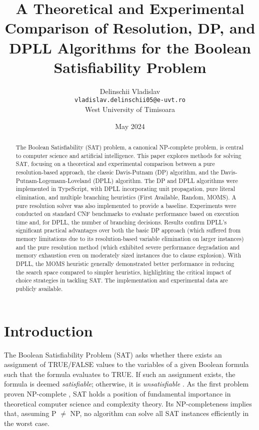 \documentclass[12pt, a4paper]{article}
\title{A Theoretical and Experimental Comparison of Resolution, DP, and DPLL Algorithms for the Boolean Satisfiability Problem}
\author{Delinschii Vladislav\\ \texttt{vladislav.delinschii05@e-uvt.ro} \\ West University of Timisoara}
\date{May 2024}
\begin{document}
\maketitle

\begin{abstract}
The Boolean Satisfiability (SAT) problem, a canonical NP-complete problem, is central to computer science and artificial intelligence. This paper explores methods for solving SAT, focusing on a theoretical and experimental comparison between a pure resolution-based approach, the classic Davis-Putnam (DP) algorithm, and the Davis-Putnam-Logemann-Loveland (DPLL) algorithm. The DP and DPLL algorithms were implemented in TypeScript, with DPLL incorporating unit propagation, pure literal elimination, and multiple branching heuristics (First Available, Random, MOMS). A pure resolution solver was also implemented to provide a baseline. Experiments were conducted on standard CNF benchmarks to evaluate performance based on execution time and, for DPLL, the number of branching decisions. Results confirm DPLL's significant practical advantages over both the basic DP approach (which suffered from memory limitations due to its resolution-based variable elimination on larger instances) and the pure resolution method (which exhibited severe performance degradation and memory exhaustion even on moderately sized instances due to clause explosion). With DPLL, the MOMS heuristic generally demonstrated better performance in reducing the search space compared to simpler heuristics, highlighting the critical impact of choice strategies in tackling SAT. The implementation and experimental data are publicly available.
\end{abstract}

\section{Introduction}
\label{sec:introduction} 
The Boolean Satisfiability Problem (SAT) asks whether there exists an assignment of TRUE/FALSE values to the variables of a given Boolean formula such that the formula evaluates to TRUE. If such an assignment exists, the formula is deemed \emph{satisfiable}; otherwise, it is \emph{unsatisfiable} \cite{Autoblocks}. As the first problem proven NP-complete \cite{Cook1971}, SAT holds a position of fundamental importance in theoretical computer science and complexity theory. Its NP-completeness implies that, assuming P $\neq$ NP, no algorithm can solve all SAT instances efficiently in the worst case.
\end{document}
